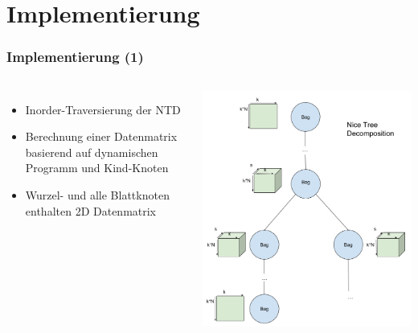 \documentclass{beamer}
\begin{document}
\section{Implementierung}
\begin{frame}
\frametitle{Implementierung (1)}
\begin{columns}[c] %

\begin{itemize}
\item Inorder-Traversierung der NTD
\item Berechnung einer Datenmatrix basierend auf dynamischen Programm und Kind-Knoten
\item Wurzel- und alle Blattknoten enthalten 2D Datenmatrix
\end{itemize}

\includegraphics[scale=0.25]{./imgs/implementation.png}

\end{columns}
\end{frame}
\end{document}
